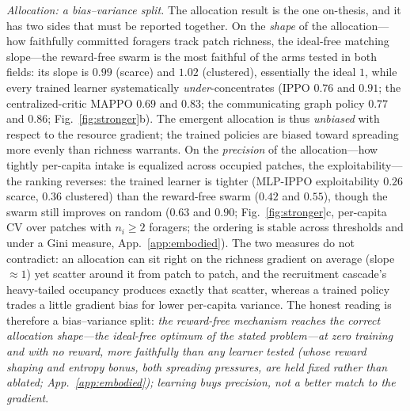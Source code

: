 \documentclass{article}
\begin{document}
\emph{Allocation: a bias--variance split.} The allocation result is the one on-thesis, and it has two sides that
must be reported together. On the \emph{shape} of the allocation---how faithfully committed foragers track patch
richness, the ideal-free matching slope---the reward-free swarm is the most faithful of the arms tested in both fields:
its slope is $0.99$ (scarce) and $1.02$ (clustered), essentially the ideal $1$, while every trained learner
systematically \emph{under}-concentrates (IPPO $0.76$ and $0.91$; the centralized-critic MAPPO $0.69$ and $0.83$;
the communicating graph policy $0.77$ and $0.86$; Fig.~\ref{fig:stronger}b). The emergent allocation is thus
\emph{unbiased} with respect to the resource gradient; the trained policies are biased toward spreading more
evenly than richness warrants. On the \emph{precision} of the allocation---how tightly per-capita intake is
equalized across occupied patches, the exploitability---the ranking reverses: the trained learner is tighter
(MLP-IPPO exploitability $0.26$ scarce, $0.36$ clustered) than the reward-free swarm ($0.42$ and $0.55$), though
the swarm still improves on random ($0.63$ and $0.90$; Fig.~\ref{fig:stronger}c, per-capita CV over patches with
$n_i\ge2$ foragers; the ordering is stable across thresholds and under a Gini measure, App.~\ref{app:embodied}).
The two measures do not contradict: an allocation can sit right on the richness gradient on average (slope
${\approx}1$) yet scatter around it from patch to patch, and the recruitment cascade's heavy-tailed occupancy
produces exactly that scatter, whereas a trained policy trades a little gradient bias for lower per-capita
variance. The honest reading is therefore a bias--variance split: \emph{the reward-free mechanism reaches the
correct allocation shape---the ideal-free optimum of the stated problem---at zero training and with no reward,
more faithfully than any learner tested (whose reward shaping and entropy bonus, both spreading pressures, are
held fixed rather than ablated; App.~\ref{app:embodied}); learning buys precision, not a better match to the gradient}.
\end{document}
